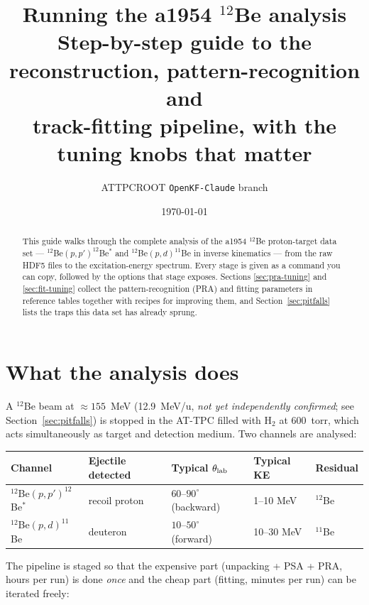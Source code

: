\documentclass[11pt,a4paper]{article}
\title{\vspace{-1.4cm}\textbf{Running the a1954 $^{12}$Be analysis}\\[2mm]
\large Step-by-step guide to the reconstruction, pattern-recognition and\\
track-fitting pipeline, with the tuning knobs that matter}
\author{ATTPCROOT \texttt{OpenKF-Claude} branch}
\date{\today}
\begin{document}
\maketitle
\thispagestyle{fancy}

\begin{abstract}
\noindent
This guide walks through the complete analysis of the a1954 $^{12}$Be proton-target
data set --- $^{12}$Be$(p,p')^{12}$Be$^{*}$ and $^{12}$Be$(p,d)^{11}$Be in inverse
kinematics --- from the raw HDF5 files to the excitation-energy spectrum. Every stage is
given as a command you can copy, followed by the options that stage exposes. Sections
\ref{sec:pra-tuning} and \ref{sec:fit-tuning} collect the pattern-recognition (PRA) and
fitting parameters in reference tables together with recipes for improving them, and
Section~\ref{sec:pitfalls} lists the traps this data set has already sprung.
\end{abstract}

\tableofcontents
\bigskip

\section{What the analysis does}

A $^{12}$Be beam at $\approx 155$~MeV (12.9~MeV/u, \emph{not yet independently confirmed};
see Section~\ref{sec:pitfalls}) is stopped in the AT-TPC filled with H$_2$ at 600~torr,
which acts simultaneously as target and detection medium. Two channels are analysed:

\begin{center}
\begin{tabular}{@{}lllll@{}}
\toprule
Channel & Ejectile detected & Typical $\theta_{\rm lab}$ & Typical KE & Residual \\
\midrule
$^{12}$Be$(p,p')^{12}$Be$^{*}$ & recoil proton   & $60$--$90^\circ$ (backward) & 1--10 MeV  & $^{12}$Be \\
$^{12}$Be$(p,d)^{11}$Be        & deuteron        & $10$--$50^\circ$ (forward)  & 10--30 MeV & $^{11}$Be \\
\bottomrule
\end{tabular}
\end{center}

The pipeline is staged so that the expensive part (unpacking + PSA + PRA, hours per run) is
done \emph{once} and the cheap part (fitting, minutes per run) can be iterated freely:
\end{document}

